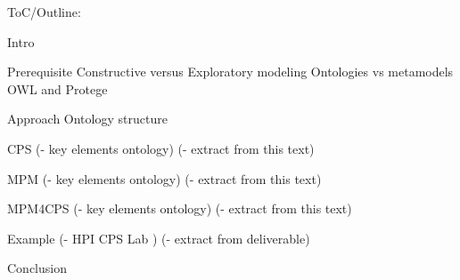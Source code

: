 \documentclass[a4paper,8pt]{article}
\begin{document}
ToC/Outline:

Intro

Prerequisite
    Constructive versus Exploratory modeling
    Ontologies vs metamodels
    OWL and Protege

Approach
    Ontology structure

CPS
(- key elements ontology)
(- extract from this text)

MPM 
(- key elements ontology)
(- extract from this text)

MPM4CPS
(- key elements ontology)
(- extract from this text)

Example
(- HPI CPS Lab )
(- extract from deliverable)

Conclusion
\end{document}
